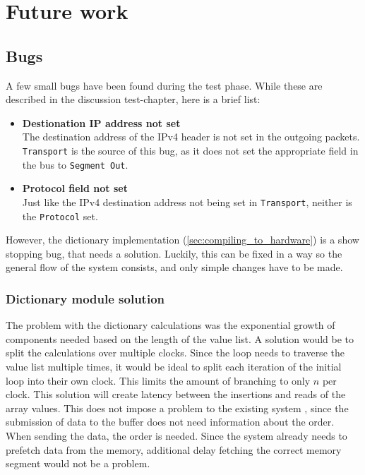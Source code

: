 \chapter{Future work}
\label{chap:future_work}

\section{Bugs}
A few small bugs have been found during the test phase. While these are
described in the discussion test-chapter, here is a brief list:
\begin{itemize}
	\item \textbf{Destionation IP address not set}\\
	The destination address of the IPv4 header is not set in the outgoing
	packets. \texttt{Transport} is the source of this bug, as it does not
	set the appropriate field in the bus to \texttt{Segment Out}.

	\item \textbf{Protocol field not set}\\
		Just like the IPv4 destination address not being set in
		\texttt{Transport}, neither is the \texttt{Protocol} set.
\end{itemize}
However, the dictionary implementation (\autoref{sec:compiling_to_hardware})
is a show stopping bug, that needs a solution. Luckily, this can be fixed in
a way so the general flow of the system consists, and only simple changes have
to be made.

\subsection{Dictionary module solution}  \label{subsec:bug_dictionary_lookup}
The problem with the dictionary calculations was the exponential growth of
components needed based on the length of the value list. A solution would
be to split the calculations over multiple clocks. Since the loop needs to
traverse the value list multiple times, it would be ideal to split each iteration
of the initial loop into their own clock. This limits the amount of branching to
only $n$ per clock. This solution will create latency between the insertions and
reads of the array values. This does not impose a problem to the existing system
, since the submission of data to the buffer does not need information about the
order. When sending the data, the order is needed. Since the system already needs
 to prefetch data from the memory, additional delay fetching the correct memory
 segment would not be a problem.


